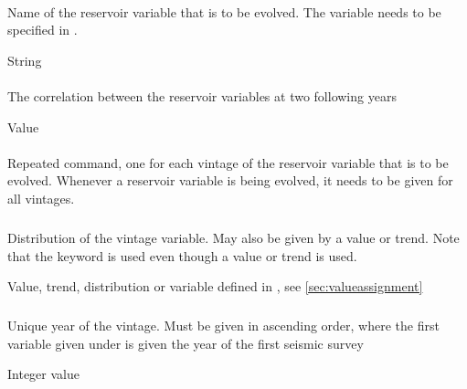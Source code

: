 {\paragraph{}
 \slist
   \item \Description Name of the reservoir variable that is to be evolved. The variable needs to be specified in .
   \item \Argument String
   \item \Default
 \elist

\paragraph{}
 \slist
   \item \Description The correlation between the reservoir variables at two following years
   \item \Argument Value
   \item {}
 \elist

\paragraph{}
 \slist
   \item \Description Repeated command, one for each vintage of the reservoir variable that is to be evolved. Whenever a reservoir variable is being evolved, it needs to be given for all vintages.
   \item \Argument
   \item \Default
 \elist

\subparagraph{}
 \slist
   \item \Description Distribution of the vintage variable. May also be given by a value or trend. Note that the keyword  is used even though a value or trend is used.
  \item \Argument Value, trend, distribution or variable defined in , see \autoref{sec:valueassignment}
   \item \Default
 \elist

\subparagraph{}
 \slist
   \item \Description Unique year of the vintage. Must be given in ascending order, where the first variable given under  is given the year of the first seismic survey
   \item \Argument Integer value
   \item \Default
 \elist

}
